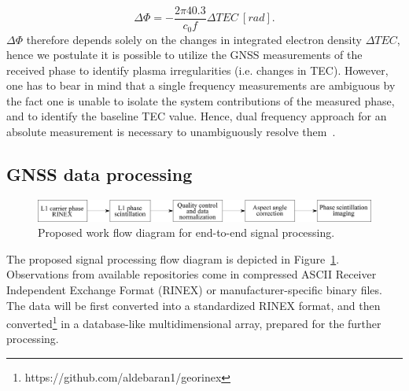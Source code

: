 \documentclass[letterpaper,12pt]{article}
\begin{document}
\begin{equation}
\Delta\Phi =- \frac{2 \pi 40.3}{c_0 f} \Delta TEC ~[rad].
\end{equation}
$\Delta\Phi$ therefore depends solely on the changes in integrated electron density $\Delta TEC$, hence we postulate it is possible to utilize the GNSS measurements of the received phase to identify plasma irregularities (i.e. changes in TEC). However, one has to bear in mind that a single frequency measurements are ambiguous by the fact one is unable to isolate the system contributions of the measured phase, and to identify the baseline TEC value. Hence, dual frequency approach for an absolute measurement is necessary to unambiguously resolve them~\citep[cf.][]{Coster1992, Rideout2006}. 

\vspace{-1em}\subsection{GNSS data processing}

\begin{figure}[h]
\includegraphics[width=\textwidth]{fig/work-flow}
\caption{Proposed work flow diagram for end-to-end signal processing.}
\label{fig:work-flow}
\end{figure}

The proposed signal processing flow diagram is depicted in Figure~\ref{fig:work-flow}. Observations from available repositories come in compressed ASCII Receiver Independent Exchange Format (RINEX) or manufacturer-specific binary files. The data will be first converted into a standardized RINEX format, and then converted\footnote{https://github.com/aldebaran1/georinex} in a database-like multidimensional array, prepared for the further processing. 
\end{document}
